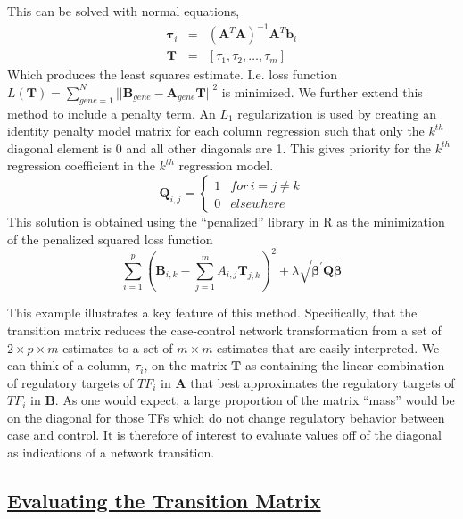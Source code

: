\documentclass[english]{article}
\begin{document}
This can be solved with normal equations, 
\begin{eqnarray*}
\mathbf{\tau}_{i} & = & \left(\mathbf{A}^{T}\mathbf{A}\right)^{-1}\mathbf{A}^{T}\mathbf{b}_{i}\\
\mathbf{T} & = & \left[\tau_{1},\tau_{2},\dots,\tau_{m}\right]
\end{eqnarray*}
Which produces the least squares estimate. I.e. loss function $L\left(\mathbf{T}\right)=\sum_{gene=1}^{N}||\mathbf{B}_{gene}-\mathbf{A}_{gene}\mathbf{T}||^{2}$
is minimized. We further extend this method to include a penalty term\cite{tibshirani1996regression}.
An $L_{1}$ regularization is used by creating an identity penalty
model matrix for each column regression such that only the $k^{th}$
diagonal element is 0 and all other diagonals are 1. This gives priority
for the $k^{th}$ regression coefficient in the $k^{th}$ regression
model. 
\[
\mathbf{Q}_{i,j}=\begin{cases}
1 & for\,i=j\ne k\\
0 & elsewhere
\end{cases}
\]
This solution is obtained using the ``penalized'' library in R as
the minimization of the penalized squared loss function
\[
\sum_{i=1}^{p}\left(\mathbf{B}_{i,k}-\sum_{j=1}^{m}A_{i,j}\mathbf{T}_{j,k}\right)^{2}+\lambda\mathbf{\sqrt{\beta^{\prime}Q\beta}}
\]


This example illustrates a key feature of this method. Specifically,
that the transition matrix reduces the case-control network transformation
from a set of $2\times p\times m$ estimates to a set of $m\times m$
estimates that are easily interpreted. We can think of a column, $\tau_{i}$,
on the matrix $\mathbf{T}$ as containing the linear combination of
regulatory targets of $TF_{i}$ in $\mathbf{A}$ that best approximates
the regulatory targets of $TF_{i}$ in $\mathbf{B}$. As one would
expect, a large proportion of the matrix ``mass'' would be on the
diagonal for those TFs which do not change regulatory behavior between
case and control. It is therefore of interest to evaluate values off
of the diagonal as indications of a network transition.


\subsection*{\uline{Evaluating the Transition Matrix}}
\end{document}
